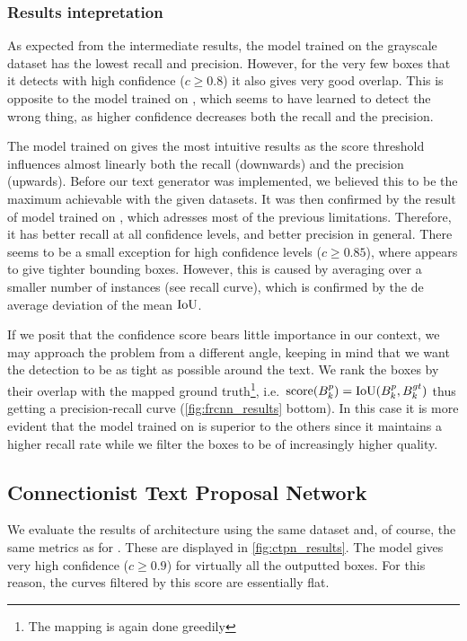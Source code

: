 		\subsubsection*{Results intepretation}
			As expected from the intermediate results, the model trained on the grayscale dataset  has the lowest recall and precision. However, for the very few boxes that it detects with high confidence (\(c \geq 0.8\)) it also gives very good overlap. This is opposite to the model trained on , which seems to have learned to detect the wrong thing, as higher confidence decreases both the recall and the precision.

			The model trained on  gives the most intuitive results as the score threshold influences almost linearly both the recall (downwards) and the precision (upwards). Before our text generator was implemented, we believed this to be the maximum achievable with the given datasets. It was then confirmed by the result of model trained on , which adresses most of the previous limitations. Therefore, it has better recall at all confidence levels, and better precision in general. There seems to be a small exception for high confidence levels (\(c \geq 0.85\)), where  appears to give tighter bounding boxes. However, this is caused by averaging over a smaller number of instances (see recall curve), which is confirmed by the de average deviation of the mean \(\operatorname{IoU}\).

			If we posit that the confidence score bears little importance in our context, we may approach the problem from a different angle, keeping in mind that we want the detection to be as tight as possible around the text. We rank the boxes by their overlap with the mapped ground truth\footnote{The mapping is again done greedily}, i.e.\ \(\operatorname{score}(B^p_k) = \operatorname{IoU}(B^p_k, B^{gt}_k)\) thus getting a precision-recall curve (\autoref{fig:frcnn_results} bottom).
			In this case it is more evident that the model trained on  is superior to the others since it maintains a higher recall rate while we filter the boxes to be of increasingly higher quality.

	\subsection{Connectionist Text Proposal Network}\label{sec:ctpn_results}
		We evaluate the results of \CTPN{} architecture using the same  dataset and, of course, the same metrics as for \FRCNN{}. These are displayed in \autoref{fig:ctpn_results}. The \CTPN{} model gives very high confidence (\(c \geq 0.9\)) for virtually all the outputted boxes. For this reason, the curves filtered by this score are essentially flat.

